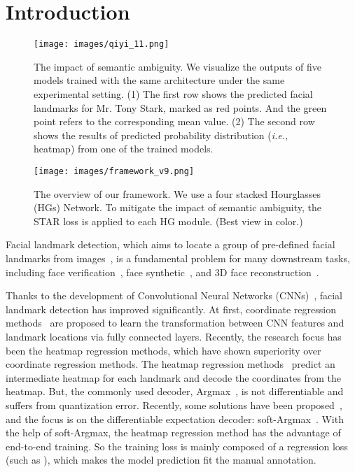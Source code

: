 \documentclass[10pt,twocolumn,letterpaper]{article}
\begin{document}
\section{Introduction}
\label{sec:intro}

\begin{figure}[t]
    \centering
    \texttt{[image: images/qiyi\_11.png]}
    \caption{
    The impact of semantic ambiguity.
    We visualize the outputs of five models trained with the same architecture under the same experimental setting. 
    (1) The first row shows the predicted facial landmarks for Mr. Tony Stark, marked as red points. And the green point refers to the corresponding mean value.
    (2) The second row shows the results of predicted probability distribution (\emph{i.e.,} heatmap) from one of the trained models.
}
    \vspace{-1.0em}
    \label{fig: intro-1}
\end{figure}

\begin{figure*}[t]
    \centering
    \texttt{[image: images/framework\_v9.png]}
    \caption{
    The overview of our framework. 
    We use a four stacked Hourglasses (HGs) Network.
    To mitigate the impact of semantic ambiguity, the STAR loss is applied to each HG module. (Best view in color.)
    }
    \label{fig: framework}
    \vspace{-10pt}
\end{figure*}

Facial landmark detection, which aims to locate a group of pre-defined facial landmarks from images~\cite{zhang2014facial, wu2018lab, xia2022splt}, is a fundamental problem for many downstream tasks, including face verification~\cite{deng2019arcface}, face synthetic~\cite{bao2018towards}, and 3D face reconstruction~\cite{deng2019accurate, feng2021learning, Danecek2022EMOCA, wood20223d}.

Thanks to the development of Convolutional Neural Networks (CNNs)~\cite{he2016deep, sandler2018mobilenetv2, tan2019efficientnet}, facial landmark detection has improved significantly.
At first, coordinate regression methods~\cite{dong2018sbr,qian2019avs,browatzki20203fabrec,wood2021fake} are proposed to learn the transformation between CNN features and landmark locations via fully connected layers.
Recently, the research focus has been the heatmap regression methods, which have shown superiority over coordinate regression methods.
The heatmap regression methods~\cite{wu2018lab,kumar2020luvli,huang2021adnet} predict an intermediate heatmap for each landmark and decode the coordinates from the heatmap.
But, the commonly used decoder, Argmax~\cite{yang2017hgfacial}, is not differentiable and suffers from quantization error.
Recently, some solutions have been proposed~\cite{tai2019fhr, lan2021hih}, and the focus is on the differentiable expectation decoder: soft-Argmax~\cite{nibali2018numerical}.
With the help of soft-Argmax, the heatmap regression method has the advantage of end-to-end training.
So the training loss is mainly composed of a regression loss (such as ), which makes the model prediction fit the manual annotation.
\end{document}
